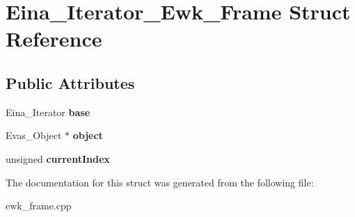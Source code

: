 \hypertarget{structEina__Iterator__Ewk__Frame}{\section{Eina\+\_\+\+Iterator\+\_\+\+Ewk\+\_\+\+Frame Struct Reference}
\label{structEina__Iterator__Ewk__Frame}
}
\subsection*{Public Attributes}
\begin{DoxyCompactItemize}
\item 
\hypertarget{structEina__Iterator__Ewk__Frame_a0464f2ba383af30465ccdfc866407123}{Eina\+\_\+\+Iterator {\bfseries base}}\label{structEina__Iterator__Ewk__Frame_a0464f2ba383af30465ccdfc866407123}

\item 
\hypertarget{structEina__Iterator__Ewk__Frame_a11a5289ed304a601833c23df5ec27932}{Evas\+\_\+\+Object $\ast$ {\bfseries object}}\label{structEina__Iterator__Ewk__Frame_a11a5289ed304a601833c23df5ec27932}

\item 
\hypertarget{structEina__Iterator__Ewk__Frame_add7f30e8322241646117741aa8122871}{unsigned {\bfseries current\+Index}}\label{structEina__Iterator__Ewk__Frame_add7f30e8322241646117741aa8122871}

\end{DoxyCompactItemize}


The documentation for this struct was generated from the following file\+:\begin{DoxyCompactItemize}
\item 
ewk\+\_\+frame.\+cpp\end{DoxyCompactItemize}
